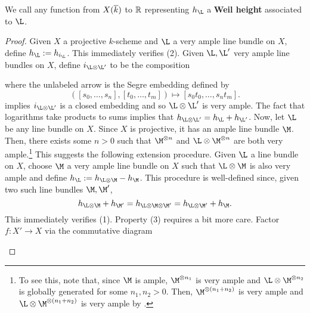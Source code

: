 \documentclass[11pt]{article}
\begin{document}
We call any function from $X(\overline{k})$ to $\mathbb{R}$ representing $h_{\L}$ a \textbf{Weil height} associated to $\L$.

\begin{proof}
Given $X$ a projective $k$-scheme and $\L$ a very ample line bundle on $X$, define $h_{\L}:=h_{i_{\L}}$. This immediately verifies (2). Given $\L,\L'$ very ample line bundles on $X$, define $i_{\L\tensor\L'}$ to be the composition
\begin{center}
\end{center}
where the unlabeled arrow is the Segre embedding defined by 
$$([s_0,\ldots,s_n],[t_0,\ldots,t_m])\mapsto[s_0t_0,\ldots,s_nt_m].$$
\cite{Ample} implies $i_{\L\tensor\L'}$ is a closed embedding and so $\L\tensor\L'$ is very ample. The fact that logarithms take products to sums implies that $h_{\L\tensor\L'}=h_{\L}+h_{\L'}$. Now, let $\L$ be any line bundle on $X$. Since $X$ is projective, it has an ample line bundle $\M$. Then, there exists some $n>0$ such that $\M^{\tensor n}$ and $\L\tensor\M^{\tensor n}$ are both very ample.\footnote{To see this, note that, since $\M$ is ample, $\M^{\tensor n_1}$ is very ample and $\L\tensor\M^{\tensor n_2}$ is globally generated for some $n_1,n_2>0$. Then, $\M^{\tensor(n_1+n_2)}$ is very ample and $\L\tensor\M^{\tensor(n_1+n_2)}$ is very ample by \cite{Ample}.} This suggests the following extension procedure. Given $\L$ a line bundle on $X$, choose $\M$ a very ample line bundle on $X$ such that $\L\tensor\M$ is also very ample and define $h_{\L}:=h_{\L\tensor\M}-h_{\M}$. This procedure is well-defined since, given two such line bundles $\M,\M'$, 
$$h_{\L\tensor\M}+h_{\M'}=h_{\L\tensor\M\tensor\M'}=h_{\L\tensor\M'}+h_{\M}.$$
This immediately verifies (1). Property (3) requires a bit more care. Factor $f: X'\to X$ via the commutative diagram
\begin{center}
\end{center}

\end{proof}
\end{document}
